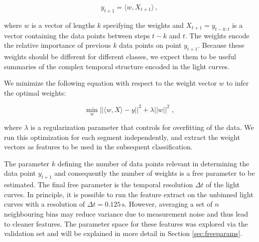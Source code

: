 \documentclass[12pt]{emulateapj}
\begin{document}
\begin{equation}
y_{t+1} = \langle w, X_{t+1} \rangle \, ,
\end{equation}

\noindent  where $w$ is a vector of lengths $k$ specifying the weights and $X_{t+1} = y_{t-k:t}$ is a vector containing the data points between steps $t-k$ and $t$. The weights encode the relative importance of previous $k$ data points on point $y_{t+1}$. Because these weights should be different for different classes, we expect them to be useful summaries of the complex temporal structure encoded in the light curves.

We minimize the following equation with respect to the weight vector $w$ to infer the optimal weights:

\begin{equation}
\min_w ||\langle w, X \rangle - y||^2 + \lambda ||w||^2 \; ,
\end{equation}

\noindent where $\lambda$ is a regularization parameter that controls for overfitting of the data. We run this optimization for each segment independently, and extract the weight vectors as features to be used in the subsequent classification.

The parameter $k$ defining the number of data points relevant in determining the data point $y_{t+1}$ and consequently the number of weights is a free parameter to be estimated. The final free parameter is the temporal resolution $\Delta t$ of the light curves. In principle, it is possible to run the feature extract on the unbinned light curves with a resolution of $\Delta t = 0.125\,\mathrm{s}$. However, averaging a set of $n$ neighbouring bins may reduce variance due to measurement noise and thus lead to cleaner features. The parameter space for these features was explored via the validation set and will be explained in more detail in Section \ref{sec:freeparams}.
\end{document}
